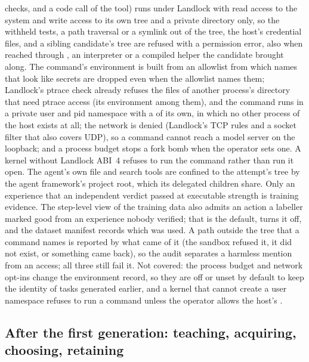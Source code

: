 \begin{enumerate}
checks, and a code call of the  tool) runs under Landlock with read access to the system and write access to its own tree
and a private directory only, so the withheld tests, a path traversal or a symlink
out of the tree, the host's credential files, and a sibling candidate's
tree are refused with a permission error, also when reached through , an
interpreter or a compiled helper the candidate brought along. The command's
environment is built from an allowlist from which names that look like secrets are dropped even
when the allowlist names them; Landlock's ptrace check already refuses the files of another process's
 directory that need ptrace access (its environment among them), and the command
runs in a private user and pid namespace with a  of its own, in which no other process
of the host exists at all; the network is denied (Landlock's
TCP rules and a socket filter that also covers UDP), so a command cannot reach a model server on the
loopback; and a process budget stops a fork bomb when the operator sets one. A kernel
without Landlock ABI~4 refuses to run the command rather than run it open. The agent's own file
and search tools are confined to the attempt's tree by the agent framework's project root,
which its delegated children share. Only an experience that an independent verdict
passed at executable strength is training evidence. The step-level view of the
training data also admits an action a labeller marked good from an experience nobody verified;
that is the default,  turns it off, and the dataset manifest
records which was used. A path outside the tree that a command names is reported by what came of it (the sandbox refused it, it did not exist, or something came back), so the audit separates a harmless mention from an access; all three still fail it. Not covered: the process budget and network opt-ins change the
environment record, so they are off or unset by default to keep the identity of tasks generated
earlier, and a kernel that cannot create a user namespace refuses to run a command unless the
operator allows the host's .
\end{enumerate}

\subsection{After the first generation: teaching, acquiring, choosing, retaining}\label{sec:after}

